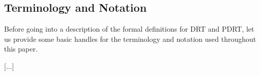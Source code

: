 \subsection{Terminology and Notation}

Before going into a description of the formal definitions for DRT and PDRT,
let us provide some basic handles for the terminology and notation used
throughout this paper. 

[...]
